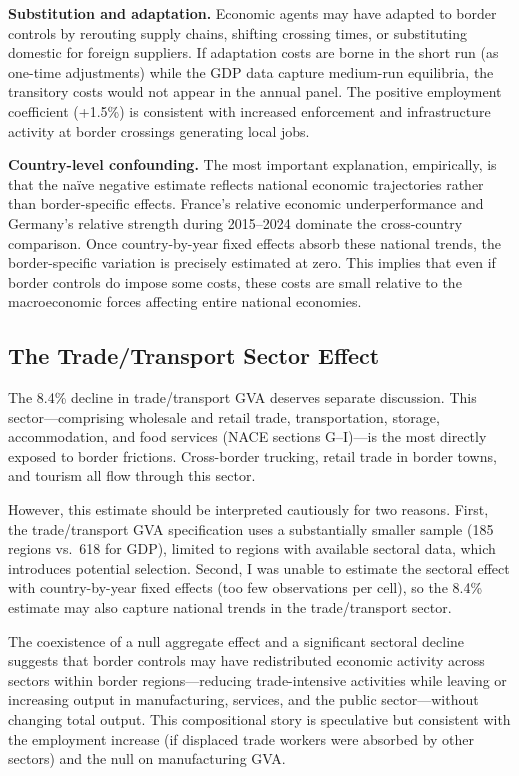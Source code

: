 \documentclass[12pt]{article}
\begin{document}
\textbf{Substitution and adaptation.} Economic agents may have adapted to border controls by rerouting supply chains, shifting crossing times, or substituting domestic for foreign suppliers. If adaptation costs are borne in the short run (as one-time adjustments) while the GDP data capture medium-run equilibria, the transitory costs would not appear in the annual panel. The positive employment coefficient (+1.5\%) is consistent with increased enforcement and infrastructure activity at border crossings generating local jobs.

\textbf{Country-level confounding.} The most important explanation, empirically, is that the na\"ive negative estimate reflects national economic trajectories rather than border-specific effects. France's relative economic underperformance and Germany's relative strength during 2015--2024 dominate the cross-country comparison. Once country-by-year fixed effects absorb these national trends, the border-specific variation is precisely estimated at zero. This implies that even if border controls do impose some costs, these costs are small relative to the macroeconomic forces affecting entire national economies.

\subsection{The Trade/Transport Sector Effect}

The 8.4\% decline in trade/transport GVA deserves separate discussion. This sector---comprising wholesale and retail trade, transportation, storage, accommodation, and food services (NACE sections G--I)---is the most directly exposed to border frictions. Cross-border trucking, retail trade in border towns, and tourism all flow through this sector.

However, this estimate should be interpreted cautiously for two reasons. First, the trade/transport GVA specification uses a substantially smaller sample (185 regions vs.\ 618 for GDP), limited to regions with available sectoral data, which introduces potential selection. Second, I was unable to estimate the sectoral effect with country-by-year fixed effects (too few observations per cell), so the 8.4\% estimate may also capture national trends in the trade/transport sector.

The coexistence of a null aggregate effect and a significant sectoral decline suggests that border controls may have redistributed economic activity across sectors within border regions---reducing trade-intensive activities while leaving or increasing output in manufacturing, services, and the public sector---without changing total output. This compositional story is speculative but consistent with the employment increase (if displaced trade workers were absorbed by other sectors) and the null on manufacturing GVA.
\end{document}
